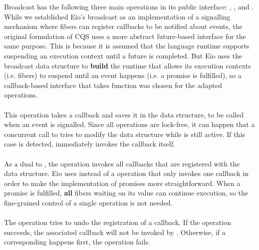 Broadcast has the following three main operations in its public interface: , , and .
While we established Eio's broadcast as an implementation of a signalling mechanism where fibers can register callbacks to be notified about events, the original formulation of CQS uses a more abstract future-based interface for the same purpose.
This is because it is assumed that the language runtime supports suspending an execution context until a future is completed.
But Eio uses the broadcast data structure to \textbf{build} the runtime that allows its execution contexts (i.e. fibers) to suspend until an event happens (i.e. a promise is fulfilled), so a callback-based interface that takes  function was chosen for the adapted operations.

\paragraph*{}
This operation takes a callback and saves it in the data structure, to be called when an event is signalled.
Since all operations are lock-free, it can happen that a concurrent call to  tries to modify the data structure while  is still active.
If this case is detected,  immediately invokes the callback itself.

\paragraph*{}
As a dual to , the  operation invokes all callbacks that are registered with the data structure.
Eio uses  instead of a  operation that only invokes one callback in order to make the implementation of promises more straightforward.
When a promise is fulfilled, \textbf{all} fibers waiting on its value can continue execution, so the fine-grained control of a single  operation is not needed.

\paragraph*{}
The  operation tries to undo the registration of a callback.
If the operation succeeds, the associated callback will not be invoked by .
Otherwise, if a corresponding  happens first, the operation fails.

